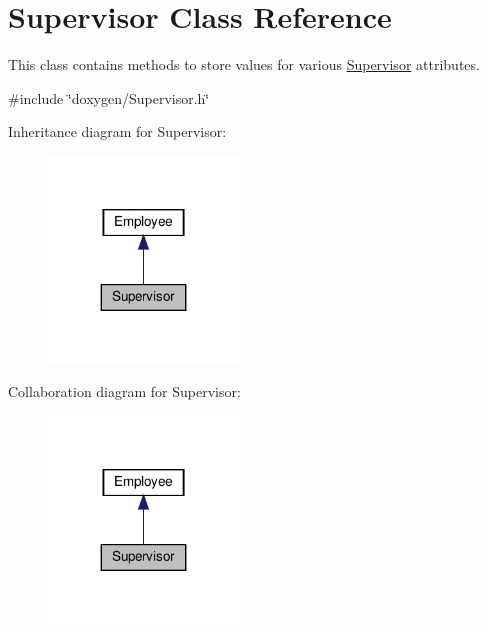 \hypertarget{classSupervisor}{}\section{Supervisor Class Reference}
\label{classSupervisor}


This class contains methods to store values for various \hyperlink{classSupervisor}{Supervisor} attributes.  




{\ttfamily \#include \char`\"{}doxygen/\+Supervisor.\+h\char`\"{}}



Inheritance diagram for Supervisor\+:\nopagebreak
\begin{figure}[H]
\begin{center}
\leavevmode
\includegraphics[width=143pt]{classSupervisor__inherit__graph}
\end{center}
\end{figure}


Collaboration diagram for Supervisor\+:\nopagebreak
\begin{figure}[H]
\begin{center}
\leavevmode
\includegraphics[width=143pt]{classSupervisor__coll__graph}
\end{center}
\end{figure}
